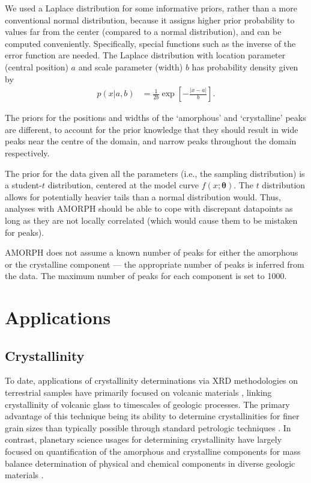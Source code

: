 \documentclass[review]{elsarticle}
\newcommand{\changed}{\color{blue}}
\begin{document}
We used a Laplace distribution for some informative priors, rather than
a more conventional normal distribution, because it assigns higher
prior probability to values far from the center  {\changed (compared to a normal
distribution)}, and can be computed conveniently. Specifically,
special functions such as the inverse of the error function are needed.
The Laplace distribution with location parameter
(central position) $a$ and scale parameter (width) $b$ has probability
density given by
\begin{align}
p(x | a, b) &= \frac{1}{2b}\exp\left[-\frac{|x - a|}{b}\right].
\end{align}

The priors for the positions and widths of the `amorphous' and `crystalline'
{\changed peaks} are different, to account for the prior knowledge that they
should result in wide {\changed peaks} near the centre of the domain, and
narrow {\changed peaks} throughout the domain respectively.

The prior for the data given all the parameters  {\changed (i.e., the sampling distribution)}
is a student-$t$ distribution,  {\changed centered at the model curve $f(x; \boldsymbol{\theta})$}.
{\changed The $t$ distribution} allows for potentially heavier tails than a normal distribution would.
Thus, analyses with AMORPH should be able to cope with discrepant datapoints
as long as they are not locally correlated (which would cause them to be
mistaken for peaks).

AMORPH does not assume a known number of {\changed peaks} for either the
amorphous or the crystalline component --- the appropriate number of
{\changed peaks} is inferred from the data. The maximum number of {\changed peaks}
for each component is set to {\changed 1000}.

\section{Applications}\label{sec:applications}
\subsection{Crystallinity}
{\changed To date, applications of crystallinity determinations via XRD methodologies on terrestrial samples have primarily focused on volcanic materials \citep[e.g.,][]{wall2014, ellis2015, andrade2017, zorn2018}, linking crystallinity of volcanic glass to timescales of geologic processes. The primary advantage of this technique being its ability to determine crystallinities for finer grain sizes than typically possible through standard petrologic techniques \citep{rowe2012}. In contrast, planetary science usages for determining crystallinity have largely focused on quantification of the amorphous and crystalline components for mass balance determination of physical and chemical components in diverse geologic materials \citep[e.g.,][]{blake2013, dehouck2014}}. 
\end{document}
